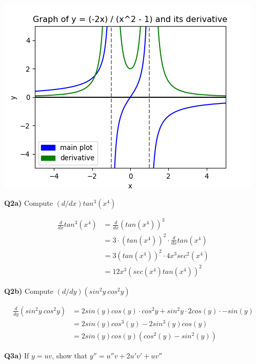 \documentclass[9pt]{article}
\begin{document}
\begin{center}
  \includegraphics[scale=0.8]{q1_odd.png}
\end{center}


\begin{tcolorbox}
  \textbf{Q2a)} Compute $(d/dx) tan^3(x^4)$
\end{tcolorbox}

\begin{align*}
  \frac{d}{dx} tan^3 (x^4) &= \frac{d}{dx} (tan(x^4))^3\\
                           &= 3 \cdot (tan(x^4))^2 \cdot \frac{d}{dx} tan(x^4)\\
                           &= 3(tan(x^4))^2 \cdot 4x^3 sec^2(x^4)\\
                           &= 12x^3 (sec(x^4)tan(x^4))^2
\end{align*}


\begin{tcolorbox}
  \textbf{Q2b)} Compute $(d/dy)(sin^2y\ cos^2y)$
\end{tcolorbox}

\begin{align*}
  \frac{d}{dy} (sin^2y\ cos^2y) &= 2sin(y)cos(y) \cdot cos^2y + sin^2y \cdot 2cos(y) \cdot -sin(y)\\
                                &= 2sin(y)cos^3(y) - 2sin^3(y)cos(y)\\
                                &= 2sin(y)cos(y)(cos^2(y) - sin^2(y))
\end{align*}


\begin{tcolorbox}
  \textbf{Q3a)} If $y = uv$, show that $y'' = u''v + 2u'v' + uv''$
\end{tcolorbox}
\end{document}
